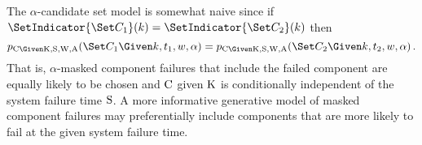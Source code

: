 \documentclass[../main.tex]{subfiles}
\begin{document}
\begin{remark}
The $\alpha$-candidate set model is somewhat naive since if $\SetIndicator{\cand_1}(k) = \SetIndicator{\cand_2}(k)$ then
\begin{equation}
\pmf_{\rvcand \Given \RV{K}, \sv, \RV{W}, \RV{A}}(\cand_1 \Given k, t_1, w, \alpha) = \pmf_{\rvcand \Given \RV{K}, \sv, \RV{W}, \RV{A}}(\cand_2 \Given k, t_2, w, \alpha)\,.
\end{equation}
That is, $\alpha$-masked component failures that include the failed component are equally likely to be chosen and $\mathrm{C}$ given $\mathrm{K}$ is conditionally independent of the system failure time $\mathrm{S}$.
A more informative generative model of masked component failures may preferentially include components that are more likely to fail at the given system failure time.
\end{remark}
\end{document}
